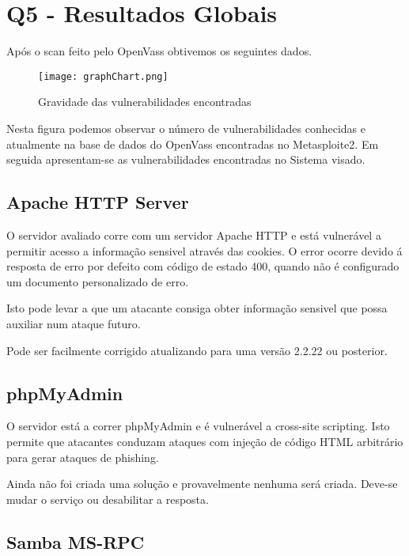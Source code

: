 
\section{Q5 - Resultados Globais}

Após o scan feito pelo OpenVass obtivemos os seguintes dados.

\begin{figure}[H]

  \centering

  \texttt{[image: graphChart.png]}

  \caption {Gravidade das vulnerabilidades encontradas}

  \label {fig1}

\end{figure}

Nesta figura podemos observar o número de vulnerabilidades conhecidas e atualmente na base de dados do OpenVass encontradas no Metasploite2.
Em seguida apresentam-se as vulnerabilidades encontradas no Sistema visado.

\subsection{Apache HTTP Server}

\par O servidor avaliado corre com um servidor Apache HTTP e está vulnerável a permitir acesso a informação sensivel através das cookies. O error ocorre devido á resposta de erro por defeito com código de estado 400, quando não é configurado um documento personalizado de erro.
\par Isto pode levar a que um atacante consiga obter informação sensivel que possa auxiliar num ataque futuro.
\par Pode ser facilmente corrigido atualizando para uma versão 2.2.22 ou posterior.

\subsection{phpMyAdmin}

O servidor está a correr phpMyAdmin e é vulnerável a cross-site scripting. Isto permite que atacantes conduzam ataques com injeção de código HTML arbitrário para gerar ataques de phishing.
\par Ainda não foi criada uma solução e provavelmente nenhuma será criada. Deve-se mudar o serviço ou desabilitar a resposta.


\subsection{Samba MS-RPC}

